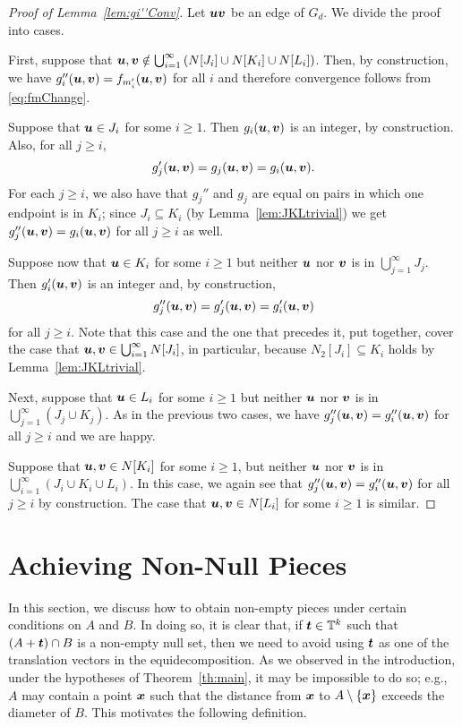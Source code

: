 \documentclass[12pt,a4paper]{amsart}
\numberwithin{equation}{section}
\theoremstyle{definition}
\begin{document}
\begin{proof}[Proof of Lemma~\ref{lem:gi''Conv}]
Let $\boldsymbol{u}\boldsymbol{v}$ be an edge of $G_d$. We divide the proof into cases.

First, suppose that $\boldsymbol{u},\boldsymbol{v}\notin\bigcup_{i=1}^\infty \left(N[J_i]\cup N[K_i]\cup N[L_i]\right)$. Then, by construction, we have $g_i''(\boldsymbol{u},\boldsymbol{v})=f_{m_i'}(\boldsymbol{u},\boldsymbol{v})$ for all $i$ and therefore convergence follows from \eqref{eq:fmChange}. 

Suppose that $\boldsymbol{u}\in J_i$ for some $i\geq1$. Then $g_i(\boldsymbol{u},\boldsymbol{v})$ is an integer, by construction. Also, for all $j\geq i$, 
\[g_j'(\boldsymbol{u},\boldsymbol{v})= g_j(\boldsymbol{u},\boldsymbol{v})=g_i(\boldsymbol{u},\boldsymbol{v}).\]   
For each $j\geq i$, we also have that $g_j''$ and $g_j$ are equal on pairs in which one endpoint is in $K_i$; since $J_i\subseteq K_i$ (by Lemma~\ref{lem:JKLtrivial}) we get $g_j''(\boldsymbol{u},\boldsymbol{v})=g_i(\boldsymbol{u},\boldsymbol{v})$ for all $j\geq i$ as well.

Suppose now that $\boldsymbol{u}\in K_i$ for some $i\geq1$ but neither $\boldsymbol{u}$ nor $\boldsymbol{v}$ is in $\bigcup_{j=1}^\infty J_j$. Then $g_i'(\boldsymbol{u},\boldsymbol{v})$ is an integer and, by construction, 
\[g_j''(\boldsymbol{u},\boldsymbol{v})=g_j'(\boldsymbol{u},\boldsymbol{v})=g_i'(\boldsymbol{u},\boldsymbol{v})\]
for all $j\geq i$. Note that this case and the one that precedes it, put together, cover the case that $\boldsymbol{u},\boldsymbol{v}\in \bigcup_{i=1}^\infty N[J_i]$, in particular, because $N_2[J_i]\subseteq K_i$ holds by Lemma~\ref{lem:JKLtrivial}.

Next, suppose that $\boldsymbol{u}\in L_i$ for some $i\geq1$ but neither $\boldsymbol{u}$ nor $\boldsymbol{v}$ is in $\bigcup_{j=1}^\infty \left(J_j\cup K_j\right)$. As in the previous two cases, we have $g_j''(\boldsymbol{u},\boldsymbol{v})= g_i''(\boldsymbol{u},\boldsymbol{v})$ for all $j\geq i$ and we are happy.

Suppose that $\boldsymbol{u},\boldsymbol{v}\in N[K_i]$ for some $i\geq1$, but neither $\boldsymbol{u}$ nor $\boldsymbol{v}$ is in $\bigcup_{i=1}^\infty \left(J_i\cup K_i\cup L_i\right)$. In this case, we again see that $g_j''(\boldsymbol{u},\boldsymbol{v})=g_i''(\boldsymbol{u},\boldsymbol{v})$ for all $j\geq i$ by construction. The case that $\boldsymbol{u},\boldsymbol{v}\in N[L_i]$ for some $i\geq1$ is similar. 
\end{proof}


\section{Achieving Non-Null Pieces}
\label{sec:nonNull}

In this section, we discuss how to obtain non-empty pieces under certain conditions on $A$ and $B$. In doing so, it is clear that, if $\boldsymbol{t}\in \mathbb{T}^k$ such that $(A+\boldsymbol{t})\cap B$ is a non-empty null set, then we need to avoid using $\boldsymbol{t}$ as one of the translation vectors in the equidecomposition. As we observed in the introduction, under the hypotheses of Theorem~\ref{th:main}, it may be impossible to do so; e.g., $A$ may contain a point $\boldsymbol{x}$ such that the distance from $\boldsymbol{x}$ to $A\setminus\{\boldsymbol{x}\}$ exceeds the diameter of $B$. This motivates the following definition.
\end{document}

